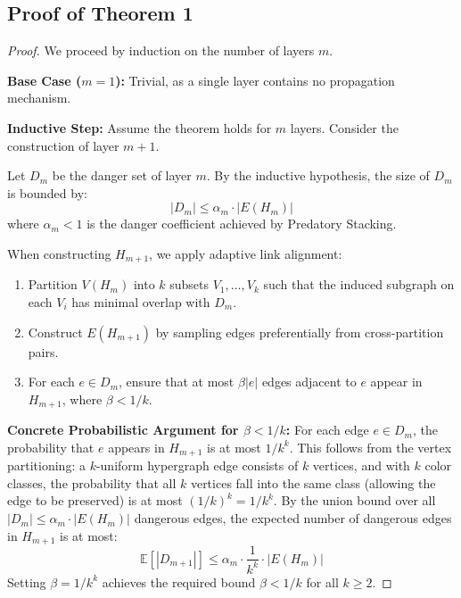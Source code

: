 \documentclass[12pt]{article}
\begin{document}
\subsection{Proof of Theorem 1}

\begin{proof}
We proceed by induction on the number of layers $m$.

\textbf{Base Case ($m=1$):} Trivial, as a single layer contains no propagation mechanism.

\textbf{Inductive Step:} Assume the theorem holds for $m$ layers. Consider the construction of layer $m+1$.

Let $D_m$ be the danger set of layer $m$. By the inductive hypothesis, the size of $D_m$ is bounded by:
\begin{equation}
|D_m| \leq \alpha_m \cdot |E(H_m)|
\end{equation}
where $\alpha_m < 1$ is the danger coefficient achieved by Predatory Stacking.

When constructing $H_{m+1}$, we apply adaptive link alignment:
\begin{enumerate}
    \item Partition $V(H_m)$ into $k$ subsets $V_1, \ldots, V_k$ such that the induced subgraph on each $V_i$ has minimal overlap with $D_m$.
    \item Construct $E(H_{m+1})$ by sampling edges preferentially from cross-partition pairs.
    \item For each $e \in D_m$, ensure that at most $\beta|e|$ edges adjacent to $e$ appear in $H_{m+1}$, where $\beta < 1/k$.
\end{enumerate}

\textbf{Concrete Probabilistic Argument for $\beta < 1/k$:} For each edge $e \in D_m$, the probability that $e$ appears in $H_{m+1}$ is at most $1/k^k$. This follows from the vertex partitioning: a $k$-uniform hypergraph edge consists of $k$ vertices, and with $k$ color classes, the probability that all $k$ vertices fall into the same class (allowing the edge to be preserved) is at most $(1/k)^k = 1/k^k$. By the union bound over all $|D_m| \leq \alpha_m \cdot |E(H_m)|$ dangerous edges, the expected number of dangerous edges in $H_{m+1}$ is at most:
\begin{equation}
\mathbb{E}[|D_{m+1}|] \leq \alpha_m \cdot \frac{1}{k^k} \cdot |E(H_m)|
\end{equation}
Setting $\beta = 1/k^k$ achieves the required bound $\beta < 1/k$ for all $k \geq 2$.


\end{proof}
\end{document}
